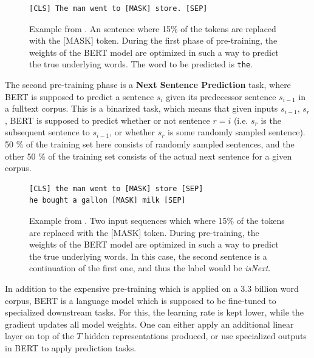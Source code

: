 \documentclass[a4paper,12pt,oneside,openright]{report}
\begin{document}
\begin{tcolorbox}
\begin{figure}[H]
\begin{verbatim}
[CLS] The man went to [MASK] store. [SEP]
\end{verbatim}
\caption{Example from \cite{devlin18}. 
An sentence where 15\% of the tokens are replaced with the [MASK] token. 
During the first phase of pre-training, the weights of the BERT model are optimized in such a way to predict the true underlying words.
The word to be predicted is \texttt{the}.
}
\end{figure}
\end{tcolorbox}

The second pre-training phase is a \textbf{Next Sentence Prediction} task, where BERT is supposed to predict a sentence $s_i$ given its predecessor sentence $s_{i-1}$ in a fulltext corpus.
This is a binarized task, which means that given inputs $s_{i-1}$, $s_r$, BERT is supposed to predict whether or not sentence $r = i$ (i.e. $s_r$ is the subsequent sentence to $s_{i-1}$, or whether $s_r$ is some randomly sampled sentence).
50 \% of the training set here consists of randomly sampled sentences, and the other 50 \% of the training set consists of the actual next sentence for a given corpus.

\begin{tcolorbox}
\begin{figure}[H]
\begin{verbatim}
[CLS] the man went to [MASK] store [SEP]
he bought a gallon [MASK] milk [SEP]
\end{verbatim}
\caption{Example from \cite{devlin18}. 
Two input sequences which where 15\% of the tokens are replaced with the [MASK] token. 
During pre-training, the weights of the BERT model are optimized in such a way to predict the true underlying words.
In this case, the second sentence is a continuation of the first one, and thus the label would be \textit{isNext}.
}
\end{figure}
\end{tcolorbox}

In addition to the expensive pre-training which is applied on a 3.3 billion word corpus, BERT is a language model which is supposed to be fine-tuned to specialized downstream tasks.
For this, the learning rate is kept lower, while the gradient updates all model weights.
One can either apply an additional linear layer on top of the $T$ hidden representations produced, or use specialized outputs in BERT to apply prediction tasks.
\end{document}
